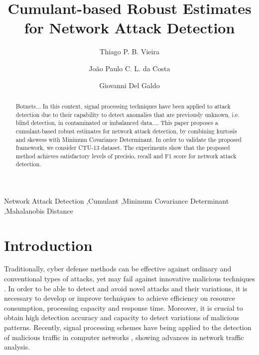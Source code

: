 \documentclass[review]{elsarticle}
\begin{document}
\begin{frontmatter}

\title{Cumulant-based Robust Estimates for Network Attack Detection}

\author[unbaddress]{Thiago P. B. Vieira}
\author[unbaddress,Ilmenauaddress,Fraunhoferaddress]{João Paulo C. L. da Costa}
\author[Ilmenauaddress,Fraunhoferaddress]{Giovanni Del Galdo}

\address[unbaddress]{Department of Electrical Engineering, University of Brasilia (UnB), 70910-900, Brasília-DF, Brazil}
\address[Ilmenauaddress]{Institute for Information Technology, Ilmenau University of Technology, Ilmenau, Germany}
\address[Fraunhoferaddress]{Fraunhofer Institute for Integrated Circuits IIS, Erlangen, Germany}


\begin{abstract}
Botnets... In this context, signal processing techniques have been applied to attack detection due to their capability to detect anomalies that are previously unknown, i.e. blind detection, in contaminated or imbalanced data.... This paper proposes a cumulant-based robust estimates for network attack detection, by combining kurtosis and skewess with Minimum Covariance Determinant. In order to validate the proposed framework, we consider CTU-13 dataset. The experiments show that the proposed method achieves satisfactory levels of precisio, recall and F1 score for network attack detection.
\end{abstract}

\begin{keyword}
Network Attack Detection \sep Cumulant \sep Minimum Covariance Determinant \sep Mahalanobis Distance
\end{keyword}

\end{frontmatter}

\linenumbers

\section{Introduction}
\label{sec:introduction}

Traditionally, cyber defense methods can be effective against ordinary and conventional types of attacks, yet may fail against innovative malicious techniques \cite{lakhina2005mining}. In order to be able to detect and avoid novel attacks and their variations, it is necessary to develop or improve techniques to achieve efficiency on resource consumption, processing capacity and response time. Moreover, it is crucial to obtain high detection accuracy and capacity to detect variations of malicious patterns. Recently, signal processing schemes have being applied to the detection of malicious traffic in computer networks \cite{Lu2009,Huang2009,Zonglin2009,david2011blind,da2012improved,tenorio2013greatest}, showing advances in network traffic analysis.
\end{document}
